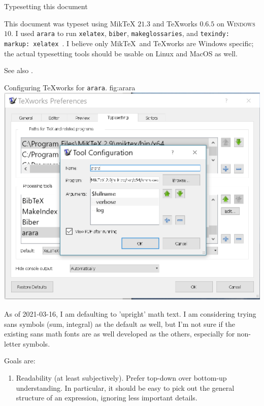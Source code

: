 \begin{plSection}{Typesetting this document}

This document was typeset using Mik\TeX{} $21.3$ 
\cite{Schenk:2017:Miktex} 
and {\TeX}works $0.6.5$ \cite{KewLoffler:2017:Texworks} 
on \textsc{Windows} $10$. 
I used \texttt{arara} \cite{CeredaEtAl:2021:Arara} 
to run \texttt{xelatex}, \texttt{biber}, \texttt{makeglossaries},  
and
\texttt{texindy: { markup: xelatex }}.
I believe only Mik\TeX\  and {\TeX}works are Windows specific; 
the actual typesetting tools should be usable on Linux and MacOS 
as well.

See also \cite{Talbot:2012:LatexNovices,Talbot:2013:LatexPhD}.

\begin{plScreen}
{Configuring {\TeX}works for \texttt{arara}.}
{fig:arara}
\centering
\includegraphics[scale=0.75]{arara.png}
\end{plScreen}

As of 2021-03-16, I am defaulting to 'upright' math text.
I am considering trying sans symbols (sum, integral) 
as the default as well,
but I'm not sure if the existing sans math fonts are as well
developed as the others, especially for non-letter symbols.

Goals are:
\begin{enumerate}
\item Readability (at least subjectively). Prefer top-down over
    bottom-up understanding. In particular, it should be easy to
    pick out the general structure of an expression, ignoring
    less important details.


\end{enumerate}
\end{plSection}
